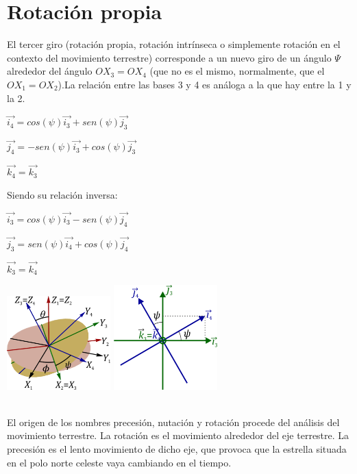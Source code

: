 \documentclass[12pt,a4paper]{report}
\begin{document}
\section{Rotación propia}
El tercer giro (rotación propia, rotación intrínseca o simplemente rotación en el contexto del movimiento terrestre) corresponde a un nuevo giro de un ángulo $\Psi$ alrededor del ángulo $OX_{3}=OX_{4}$ (que no es el mismo, normalmente, que el $OX_{1}=OX_{2}$).La relación entre las bases 3 y 4 es análoga a la que hay entre la 1 y la 2.
\begin{center}
$\overrightarrow{i_{4}}=cos(\psi)\overrightarrow{i_{3}}+sen(\psi)\overrightarrow{j_{3}}$

$\overrightarrow{j_{4}}=-sen(\psi)\overrightarrow{i_{3}}+cos(\psi)\overrightarrow{j_{3}}$

$\overrightarrow{k_{4}}=\overrightarrow{k_{3}}$
\end{center}
Siendo su relación inversa:
\begin{center}
$\overrightarrow{i_{3}}=cos(\psi)\overrightarrow{i_{3}}-sen(\psi)\overrightarrow{j_{4}}$

$\overrightarrow{j_{3}}=sen(\psi)\overrightarrow{i_{4}}+cos(\psi)\overrightarrow{j_{4}}$

$\overrightarrow{k_{3}}=\overrightarrow{k_{4}}$
\end{center}
\begin{center}
\includegraphics[width=4cm]{6.png}
\includegraphics[width=4cm]{7.png} 
\end{center} 
\noindent\\
El origen de los nombres precesión, nutación y rotación procede del análisis del movimiento terrestre. La rotación es el movimiento alrededor del eje terrestre. La precesión es el lento movimiento de dicho eje, que provoca que la estrella situada en el polo norte celeste vaya cambiando en el tiempo. \\
\end{document}
